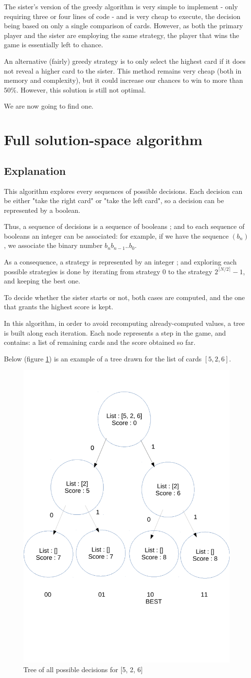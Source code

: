\documentclass[11pt]{article}
\begin{document}
The sister's version of the greedy algorithm is very simple to implement - only requiring three or four lines of code - and is very cheap to execute, the decision being based on only a single comparison of cards. However, as both the primary player and the sister are employing the same strategy, the player that wins the game is essentially left to chance.

An alternative (fairly) greedy strategy is to only select the highest card if it does not reveal a higher card to the sister. This method
remains very cheap (both in memory and complexity), but it could increase our chances to win to more than 50\%.
However, this solution is still not optimal.

We are now going to find one.

\section{Full solution-space algorithm}
\subsection{Explanation}
This algorithm explores every sequences of possible decisions. Each decision can
be either "take the right card" or "take the left card", so a decision can be
represented by a boolean.

Thus, a sequence of decisions is a sequence of booleans ; and to each sequence 
of booleans an integer can be associated: for example, if we have the sequence
$(b_n)$, we associate the binary number $b_nb_{n-1}..b_0$.

As a consequence, a strategy is represented by an integer ; and
exploring each possible strategies is done by iterating from strategy 0 to the
strategy $2^{\lceil{N/2}\rceil} - 1$, and keeping the best one.

To decide whether the sister starts or not, both cases are computed, and
the one that grants the highest score is kept.

In this algorithm, in order to avoid recomputing already-computed values,
a tree is built along each iteration. Each node represents a step in the game,
and contains: a list of remaining cards and the score obtained so far.

Below (figure \ref{tree}) is an example of a tree drawn 
for the list of cards $[5, 2, 6]$.
\begin{figure}[ht]
	\center
	\label{tree}
	\includegraphics[width=0.32\linewidth]{complete_space.pdf}
	\caption{Tree of all possible decisions for [5, 2, 6]}
\end{figure}
\end{document}
